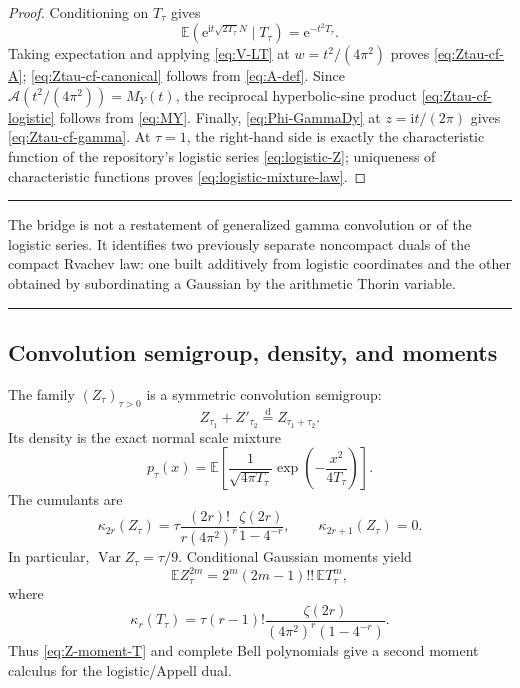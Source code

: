 \documentclass[11pt,oneside]{article}
\theoremstyle{definition}
\theoremstyle{remark}
\newcommand{\E}{\mathbb E}
\newcommand{\e}{\mathrm e}
\newcommand{\ii}{\mathrm i}
\newcommand{\Var}{\operatorname{Var}}
\newcommand{\dist}{\mathrel{\stackrel{\mathrm d}=}}
\newcommand{\Acal}{\mathcal A}
\newenvironment{resultbox}{%
  \par\medskip\noindent\begin{center}\begin{minipage}{0.94\textwidth}%
  \color{black}\hrule\vspace{0.65em}\small
}{%
  \vspace{0.65em}\hrule\end{minipage}\end{center}\medskip
}
\begin{document}
\begin{proof}
Conditioning on $T_\tau$ gives
\[
 \E(\e^{\ii t\sqrt{2T_\tau}N}\mid T_\tau)=\e^{-t^2T_\tau}.
\]
Taking expectation and applying \eqref{eq:V-LT} at
$w=t^2/(4\pi^2)$ proves \eqref{eq:Ztau-cf-A};
\eqref{eq:Ztau-cf-canonical} follows from \eqref{eq:A-def}.  Since
$\Acal(t^2/(4\pi^2))=M_Y(t)$, the reciprocal hyperbolic-sine product
\eqref{eq:Ztau-cf-logistic} follows from \eqref{eq:MY}.  Finally,
\eqref{eq:Phi-GammaDy} at $z=\ii t/(2\pi)$ gives
\eqref{eq:Ztau-cf-gamma}.  At $\tau=1$, the right-hand side is exactly the characteristic
function of the repository's logistic series \eqref{eq:logistic-Z}; uniqueness of
characteristic functions proves \eqref{eq:logistic-mixture-law}.
\end{proof}

\begin{resultbox}
The bridge is not a restatement of generalized gamma convolution or of the logistic series.
It identifies two previously separate noncompact duals of the compact Rvachev law: one built
additively from logistic coordinates and the other obtained by subordinating a Gaussian by
the arithmetic Thorin variable.
\end{resultbox}

\subsection{Convolution semigroup, density, and moments}

The family $(Z_\tau)_{\tau>0}$ is a symmetric convolution semigroup:
\begin{equation}
 Z_{\tau_1}+Z'_{\tau_2}\dist Z_{\tau_1+\tau_2}.           \label{eq:Z-semigroup}
\end{equation}
Its density is the exact normal scale mixture
\begin{equation}
 \boxed{\quad
 p_\tau(x)=\E\left[
 \frac{1}{\sqrt{4\pi T_\tau}}
 \exp\left(-\frac{x^2}{4T_\tau}\right)
 \right].
 \quad}                                                  \label{eq:Z-density-mixture}
\end{equation}
The cumulants are
\begin{equation}
 \kappa_{2r}(Z_\tau)
 =\tau\frac{(2r)!}{r(4\pi^2)^r}
 \frac{\zeta(2r)}{1-4^{-r}},
 \qquad \kappa_{2r+1}(Z_\tau)=0.                        \label{eq:Z-cumulants}
\end{equation}
In particular, $\Var Z_\tau=\tau/9$.  Conditional Gaussian moments yield
\begin{equation}
 \E Z_\tau^{2m}=2^m(2m-1)!!\,\E T_\tau^m,               \label{eq:Z-moment-T}
\end{equation}
where
\begin{equation}
 \kappa_r(T_\tau)=
 \tau(r-1)!\frac{\zeta(2r)}{(4\pi^2)^r(1-4^{-r})}.       \label{eq:T-cumulants}
\end{equation}
Thus \eqref{eq:Z-moment-T} and complete Bell polynomials give a second moment calculus for
the logistic/Appell dual.
\end{document}
